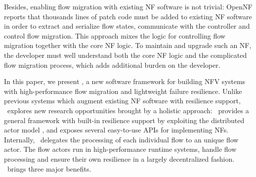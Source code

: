 

Besides, enabling flow migration with existing NF software is not trivial: OpenNF \cite{gember2015opennf} reports that thousands lines of patch code must be added to existing NF software \cite{bro, squid} in order to extract and serialize flow states, communicate with the controller and control flow migration. This approach mixes the logic for controlling flow migration together with the core NF logic. To maintain and upgrade such an NF, the developer must well understand both the core NF logic and the complicated flow migration process, which adds additional burden on the developer. %




In this paper, we present \nfactor, a new software framework for building NFV systems with high-performance flow migration and lightweight failure resilience. Unlike previous systems \cite{sherry2015rollback, rajagopalan2013pico, rajagopalan2013split, gember2015opennf} which augment existing NF software with resilience support, \nfactor~explores new research opportunities brought by a holistic approach: \nfactor~provides a general framework with built-in resilience support by exploiting the distributed actor model \cite{actor-wiki}, and exposes several easy-to-use APIs for implementing NFs. Internally, \nfactor~delegates the processing of each individual flow to an unique flow actor. The flow actors run in high-performance runtime systems, handle flow processing and ensure their own resilience in a largely decentralized fashion. \nfactor~brings three major benefits.

